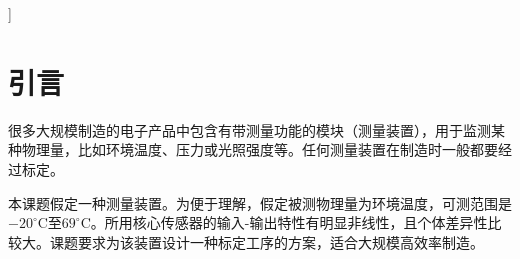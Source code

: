 \documentclass[10.5pt,twocolumn]{jbuaa}
\begin{document}
\begin{@twocolumnfalse}
  \end{@twocolumnfalse}
]
\wuhao 

\section{引言}
很多大规模制造的电子产品中包含有带测量功能的模块（测量装置），用于监测某种物理量，比如环境温度、压力或光照强度等。任何测量装置在制造时一般都要经过标定。

本课题假定一种测量装置。为便于理解，假定被测物理量为环境温度，可测范围是$-20^\circ$C至$69^\circ$C。所用核心传感器的输入-输出特性有明显非线性，且个体差异性比较大。课题要求为该装置设计一种标定工序的方案，适合大规模高效率制造。
\end{document}
